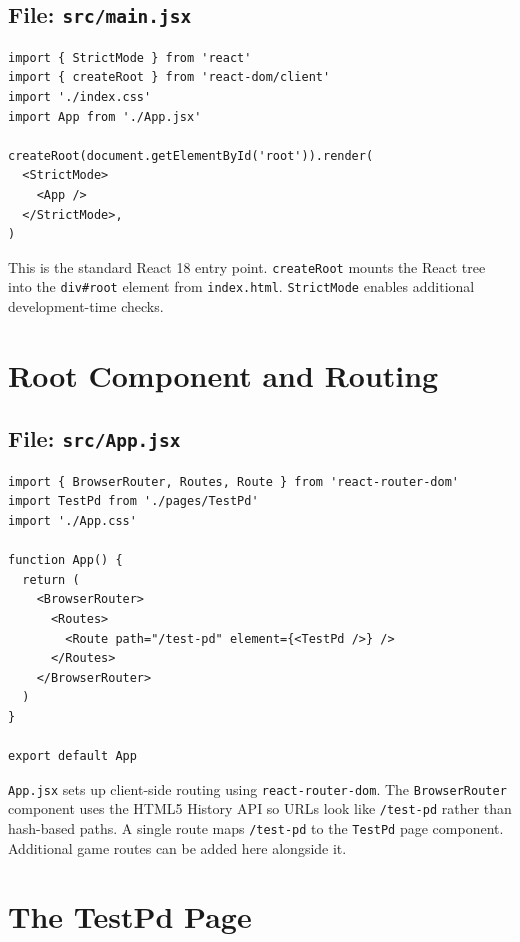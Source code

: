 \documentclass[12pt,a4paper]{article}
\begin{document}
\subsection{File: \texttt{src/main.jsx}}

\begin{lstlisting}[style=js, caption={main.jsx}]
import { StrictMode } from 'react'
import { createRoot } from 'react-dom/client'
import './index.css'
import App from './App.jsx'

createRoot(document.getElementById('root')).render(
  <StrictMode>
    <App />
  </StrictMode>,
)
\end{lstlisting}

This is the standard React 18 entry point. \texttt{createRoot} mounts the React tree into the \texttt{div\#root} element from \texttt{index.html}. \texttt{StrictMode} enables additional development-time checks.

\section{Root Component and Routing}

\subsection{File: \texttt{src/App.jsx}}

\begin{lstlisting}[style=js, caption={App.jsx}]
import { BrowserRouter, Routes, Route } from 'react-router-dom'
import TestPd from './pages/TestPd'
import './App.css'

function App() {
  return (
    <BrowserRouter>
      <Routes>
        <Route path="/test-pd" element={<TestPd />} />
      </Routes>
    </BrowserRouter>
  )
}

export default App
\end{lstlisting}

\texttt{App.jsx} sets up client-side routing using \texttt{react-router-dom}. The \texttt{BrowserRouter} component uses the HTML5 History API so URLs look like \texttt{/test-pd} rather than hash-based paths. A single route maps \texttt{/test-pd} to the \texttt{TestPd} page component. Additional game routes can be added here alongside it.

\section{The TestPd Page}
\end{document}
